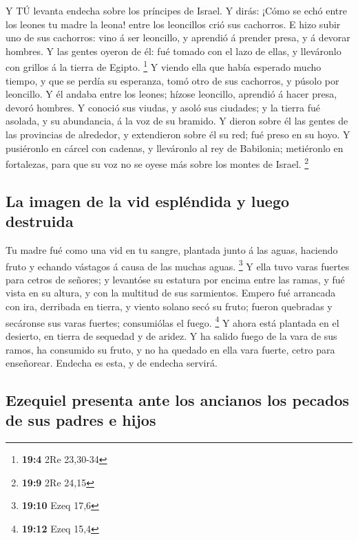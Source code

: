  Y TÚ levanta endecha sobre los príncipes de Israel.
 Y dirás: ¡Cómo se echó entre los leones tu madre la leona!
entre los leoncillos crió sus cachorros.  E hizo subir uno
de sus cachorros: vino á ser leoncillo, y aprendió á prender presa, y á
devorar hombres.  Y las gentes oyeron de él: fué tomado con
el lazo de ellas, y lleváronlo con grillos á la tierra de Egipto.
\footnote{\textbf{19:4} 2Re 23,30-34}  Y viendo ella que
había esperado mucho tiempo, y que se perdía su esperanza, tomó otro de
sus cachorros, y púsolo por leoncillo.  Y él andaba entre
los leones; hízose leoncillo, aprendió á hacer presa, devoró hombres.
 Y conoció sus viudas, y asoló sus ciudades; y la tierra fué
asolada, y su abundancia, á la voz de su bramido.  Y dieron
sobre él las gentes de las provincias de alrededor, y extendieron sobre
él su red; fué preso en su hoyo.  Y pusiéronlo en cárcel con
cadenas, y lleváronlo al rey de Babilonia; metiéronlo en fortalezas,
para que su voz no se oyese más sobre los montes de Israel. \footnote{\textbf{19:9}
  2Re 24,15}

\hypertarget{la-imagen-de-la-vid-espluxe9ndida-y-luego-destruida}{%
\subsection{La imagen de la vid espléndida y luego
destruida}\label{la-imagen-de-la-vid-espluxe9ndida-y-luego-destruida}}

 Tu madre fué como una vid en tu sangre, plantada junto á
las aguas, haciendo fruto y echando vástagos á causa de las muchas
aguas. \footnote{\textbf{19:10} Ezeq 17,6}  Y ella tuvo
varas fuertes para cetros de señores; y levantóse su estatura por encima
entre las ramas, y fué vista en su altura, y con la multitud de sus
sarmientos.  Empero fué arrancada con ira, derribada en
tierra, y viento solano secó su fruto; fueron quebradas y secáronse sus
varas fuertes; consumiólas el fuego. \footnote{\textbf{19:12} Ezeq 15,4}
 Y ahora está plantada en el desierto, en tierra de
sequedad y de aridez.  Y ha salido fuego de la vara de sus
ramos, ha consumido su fruto, y no ha quedado en ella vara fuerte, cetro
para enseñorear. Endecha es esta, y de endecha servirá.

\hypertarget{ezequiel-presenta-ante-los-ancianos-los-pecados-de-sus-padres-e-hijos}{%
\subsection{Ezequiel presenta ante los ancianos los pecados de sus
padres e
hijos}\label{ezequiel-presenta-ante-los-ancianos-los-pecados-de-sus-padres-e-hijos}}

